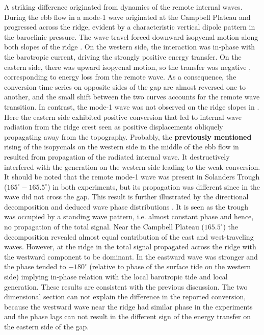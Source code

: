 \documentclass[12pt]{article}
\begin{document}
A striking difference originated from dynamics of the remote internal waves. During the ebb flow 
in  a mode-1 wave originated at the Campbell Plateau and progressed across 
the ridge, 
evident by a characteristic vertical dipole pattern in the baroclinic pressure. The wave 
travel forced downward isopycnal motion along both slopes of the ridge . 
On the western side, the 
interaction was in-phase with the barotropic current, driving the strongly positive energy 
transfer. On the eastern side, there was upward isopycnal motion, so the transfer was negative 
, corresponding to energy loss from the remote wave. As a consequence, 
the 
conversion time series on opposite sides of the gap  are almost 
reversed one to another, and the small shift between the two curves accounts for the remote wave 
transition.
In contrast, the 
mode-1 wave was not observed on the ridge slopes in . Here the eastern side exhibited 
positive 
conversion that led to internal wave radiation from the ridge crest  seen 
as positive displacements obliquely propagating away from the topography. 
Probably, the \textbf{previously mentioned} rising of the isopycnals on the western side  
in the middle of the ebb flow in  resulted from propagation of the 
radiated internal wave. It destructively interfered with the generation on the western side 
leading to the weak conversion.\\

It should be noted that the remote mode-1 wave was present in Solanders Trough 
($165^{\circ} - 165.5^{\circ}$) in both experiments, but its propagation was different since in 
 the wave did not cross the gap. This result is further illustrated by the directional 
decomposition and deduced wave phase distributions . It is seen as 
the trough was occupied 
by a standing wave pattern, i.e. almost constant phase and hence, no propagation of the total 
signal. 
Near the Campbell Plateau ($165.5^{\circ}$) the decomposition revealed almost equal contribution 
of the east and west-traveling waves. However, at the ridge in  the total signal 
propagated across the ridge with the westward component to be dominant. In  
the eastward wave was stronger and the phase tended to $-180^{\circ}$ (relative to phase of the  
surface tide on the western side) implying in-phase relation with the local barotropic tide and 
local generation. These results are consistent with the previous discussion. The two 
dimensional section can not explain the difference in the reported conversion, because 
the westward wave near the ridge had similar phase in the experiments and the phase lags can not 
result in the different sign of the energy transfer on the eastern side of the gap.\\
\end{document}
